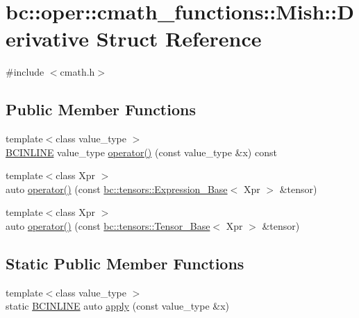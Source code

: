 \hypertarget{structbc_1_1oper_1_1cmath__functions_1_1Mish_1_1Derivative}{}\section{bc\+:\+:oper\+:\+:cmath\+\_\+functions\+:\+:Mish\+:\+:Derivative Struct Reference}
\label{structbc_1_1oper_1_1cmath__functions_1_1Mish_1_1Derivative}


{\ttfamily \#include $<$cmath.\+h$>$}

\subsection*{Public Member Functions}
\begin{DoxyCompactItemize}
\item 
{\footnotesize template$<$class value\+\_\+type $>$ }\\\hyperlink{common_8h_a6699e8b0449da5c0fafb878e59c1d4b1}{B\+C\+I\+N\+L\+I\+NE} value\+\_\+type \hyperlink{structbc_1_1oper_1_1cmath__functions_1_1Mish_1_1Derivative_a3b861c6da9893fa730f8a04bcece5d4d}{operator()} (const value\+\_\+type \&x) const
\item 
{\footnotesize template$<$class Xpr $>$ }\\auto \hyperlink{structbc_1_1oper_1_1cmath__functions_1_1Mish_1_1Derivative_a211093825ea4c5a909ed07844444f437}{operator()} (const \hyperlink{classbc_1_1tensors_1_1Expression__Base}{bc\+::tensors\+::\+Expression\+\_\+\+Base}$<$ Xpr $>$ \&tensor)
\item 
{\footnotesize template$<$class Xpr $>$ }\\auto \hyperlink{structbc_1_1oper_1_1cmath__functions_1_1Mish_1_1Derivative_aa2b523c008afa4685da6b5dc618eb11d}{operator()} (const \hyperlink{classbc_1_1tensors_1_1Tensor__Base}{bc\+::tensors\+::\+Tensor\+\_\+\+Base}$<$ Xpr $>$ \&tensor)
\end{DoxyCompactItemize}
\subsection*{Static Public Member Functions}
\begin{DoxyCompactItemize}
\item 
{\footnotesize template$<$class value\+\_\+type $>$ }\\static \hyperlink{common_8h_a6699e8b0449da5c0fafb878e59c1d4b1}{B\+C\+I\+N\+L\+I\+NE} auto \hyperlink{structbc_1_1oper_1_1cmath__functions_1_1Mish_1_1Derivative_ab3d8cade31c400d0596d145a1e895395}{apply} (const value\+\_\+type \&x)
\end{DoxyCompactItemize}


